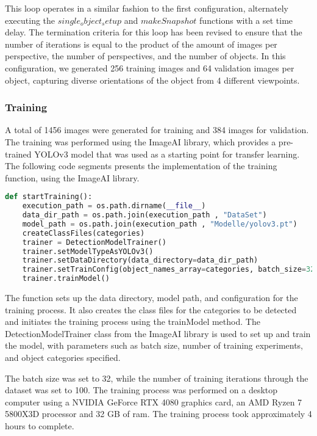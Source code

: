 This loop operates in a similar fashion to the first configuration, alternately executing the \(single_object_setup\) and \(makeSnapshot\) functions with a set time delay. The termination criteria for this loop has been revised to ensure that the number of iterations is equal to the product of the amount of images per perspective, the number of perspectives, and the number of objects. In this configuration, we generated 256 training images and 64 validation images per object, capturing diverse orientations of the object from 4 different viewpoints.

\subsubsection{Training }

A total of 1456 images were generated for training and 384 images for validation. The training was performed using the ImageAI library, which provides a pre-trained YOLOv3 model that was used as a starting point for transfer learning. The following code segments presents the implementation of the training function, using the ImageAI library. 

\begin{lstlisting}[language=python]
def startTraining():
    execution_path = os.path.dirname(__file__)
    data_dir_path = os.path.join(execution_path , "DataSet")
    model_path = os.path.join(execution_path , "Modelle/yolov3.pt")
    createClassFiles(categories) 
    trainer = DetectionModelTrainer()
    trainer.setModelTypeAsYOLOv3()
    trainer.setDataDirectory(data_directory=data_dir_path)
    trainer.setTrainConfig(object_names_array=categories, batch_size=32, num_experiments=100, train_from_pretrained_model=model_path)
    trainer.trainModel()
\end{lstlisting}
The function sets up the data directory, model path, and configuration for the training process. It also creates the class files for the categories to be detected and initiates the training process using the trainModel method. The DetectionModelTrainer class from the ImageAI library is used to set up and train the model, with parameters such as batch size, number of training experiments, and object categories specified. 

The batch size was set to 32, while the number of training iterations through the dataset was set to 100. The training process was performed on a desktop computer using a NVIDIA GeForce RTX 4080 graphics card, an AMD Ryzen 7 5800X3D processor and 32 GB of ram. The training process took approximately 4 hours to complete.


